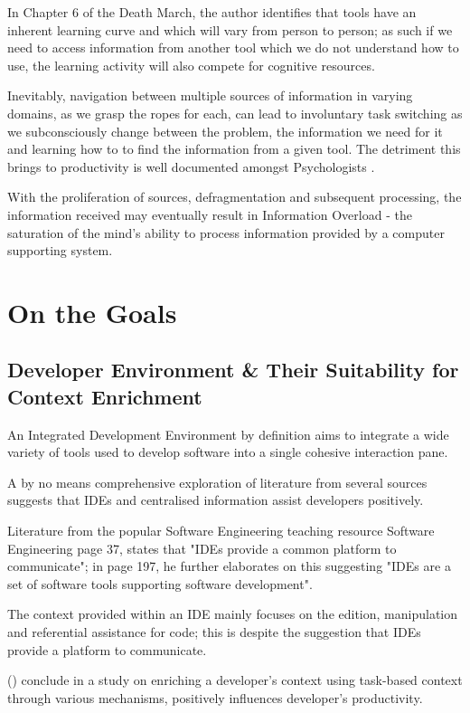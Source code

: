 In Chapter 6 of the Death March, the author identifies that tools have an inherent learning curve and which will vary from person to person; as such if we need to access information from another tool which we do not understand how to use, the learning activity will also compete for cognitive resources.

Inevitably, navigation between multiple sources of information in varying domains, as we grasp the ropes for each, can lead to involuntary task switching as we subconsciously change between the problem, the information we need for it and learning how to to find the information from a given tool. The detriment this brings to productivity is well documented amongst Psychologists \parencite{apaMultitasking}.

With the proliferation of sources, defragmentation and subsequent processing, the information received may eventually result in Information Overload - the saturation of the mind's ability to process information provided by a computer supporting system.

\section{On the Goals}

\subsection{Developer Environment \& Their Suitability for Context Enrichment}

An Integrated Development Environment by definition aims to integrate a wide variety of tools used to develop software into a single cohesive interaction pane. 

A by no means comprehensive exploration of literature from several sources suggests that IDEs and centralised information assist developers positively. 

Literature from the popular Software Engineering teaching resource Software Engineering \parencite{Sommerville:2010:SE:1841764} page 37, states that "IDEs provide a common platform to communicate"; in page 197, he further elaborates on this suggesting "IDEs are a set of software tools supporting software development".

The context provided within an IDE mainly focuses on the edition, manipulation and referential assistance for code; this is despite the suggestion that IDEs provide a platform to communicate.

\citeauthor{kersten2006using} () conclude in a study on enriching a developer's context using task-based context through various mechanisms, positively influences developer's productivity.

